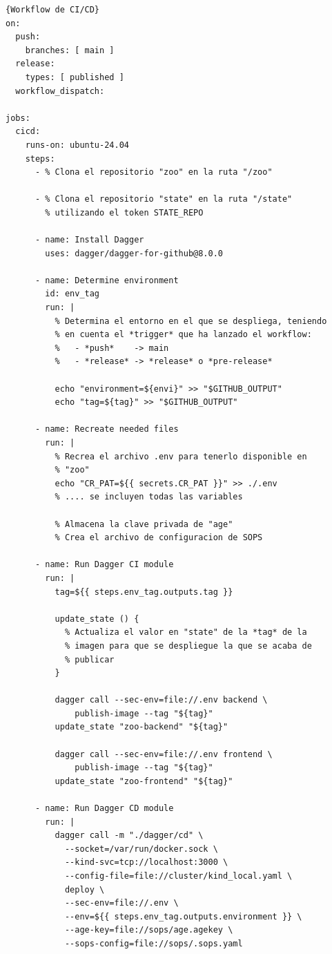 \begin{lstlisting}[language=workflows,label=lst:workflowcicd]{Workflow de CI/CD}
on:
  push:
    branches: [ main ]
  release:
    types: [ published ]
  workflow_dispatch:

jobs:
  cicd:
    runs-on: ubuntu-24.04
    steps:
      - % Clona el repositorio "zoo" en la ruta "/zoo"

      - % Clona el repositorio "state" en la ruta "/state"
        % utilizando el token STATE_REPO

      - name: Install Dagger
        uses: dagger/dagger-for-github@8.0.0

      - name: Determine environment
        id: env_tag
        run: |
          % Determina el entorno en el que se despliega, teniendo
          % en cuenta el *trigger* que ha lanzado el workflow:
          %   - *push*    -> main
          %   - *release* -> *release* o *pre-release*

          echo "environment=${envi}" >> "$GITHUB_OUTPUT"
          echo "tag=${tag}" >> "$GITHUB_OUTPUT"

      - name: Recreate needed files
        run: |
          % Recrea el archivo .env para tenerlo disponible en
          % "zoo"
          echo "CR_PAT=${{ secrets.CR_PAT }}" >> ./.env
          % .... se incluyen todas las variables

          % Almacena la clave privada de "age"
          % Crea el archivo de configuracion de SOPS

      - name: Run Dagger CI module
        run: |
          tag=${{ steps.env_tag.outputs.tag }} 

          update_state () {
            % Actualiza el valor en "state" de la *tag* de la
            % imagen para que se despliegue la que se acaba de
            % publicar
          }

          dagger call --sec-env=file://.env backend \
              publish-image --tag "${tag}"
          update_state "zoo-backend" "${tag}"

          dagger call --sec-env=file://.env frontend \
              publish-image --tag "${tag}"
          update_state "zoo-frontend" "${tag}"

      - name: Run Dagger CD module
        run: |
          dagger call -m "./dagger/cd" \
            --socket=/var/run/docker.sock \
            --kind-svc=tcp://localhost:3000 \
            --config-file=file://cluster/kind_local.yaml \
            deploy \
            --sec-env=file://.env \
            --env=${{ steps.env_tag.outputs.environment }} \
            --age-key=file://sops/age.agekey \
            --sops-config=file://sops/.sops.yaml
\end{lstlisting}

